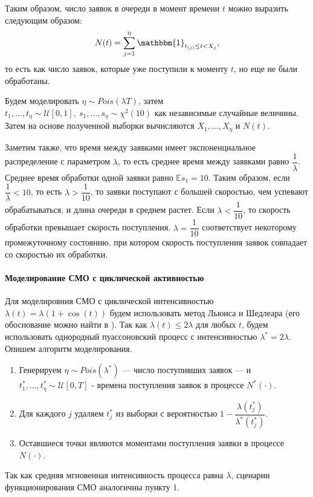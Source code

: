 \documentclass[16pt]{article}
\newcommand{\I}{\mathbbm{1}}
\begin{document}
Таким образом, число заявок в очереди в момент времени $t$ можно выразить следующим образом:
$$N(t) = \sum_{j=1}^{\eta}\I_{t_{(j)} \leq t < X_j},$$
то есть как число заявок, которые уже поступили к моменту $t$, но еще не были обработаны.

Будем моделировать $\eta \sim Pois(\lambda T)$, затем $t_1, \ldots, t_\eta \sim \mathcal{U}[0, 1],\ s_1, \ldots, s_\eta \sim \chi^2(10)$ как независимые случайные величины. Затем на основе полученной выборки вычисляются $X_1, \ldots, X_\eta$ и $N(t)$.

Заметим также, что время между заявками имеет экспоненциальное распределение с параметром $\lambda$, то есть среднее время между заявками равно $\dfrac{1}{\lambda}$. Среднее время обработки одной заявки равно $\mathbb{E}s_1 = 10$. Таким образом, если $\dfrac{1}{\lambda} < 10$, то есть $\lambda > \dfrac{1}{10}$, то заявки поступают с большей скоростью, чем успевают обрабатываться, и длина очереди в среднем растет.
Если $\lambda < \dfrac{1}{10}$, то скорость обработки превышает скорость поступления. $\lambda = \dfrac{1}{10}$ соответствует некоторому промежуточному состоянию,
при котором скорость поступления заявок совпадает со скоростью их обработки.

\paragraph{Моделирование СМО с циклической активностью}
Для моделировния СМО с циклической интенсивностью $\lambda(t) = \lambda(1 + \cos(t))$ будем использовать метод Льюиса и Шедлеара (его обоснование можно найти в \cite{Lewis}). Так как $\lambda(t) \leq 2\lambda$ для любых $t$, будем использовать однородный пуассоновский процесс с интенсивностью $\lambda^* = 2 \lambda$. Опишем алгоритм моделирования.

\begin{enumerate}
	\item Генерируем $\eta \sim Pois(\lambda^*)$ --- число поступивших заявок --- и $t_1^*, \ldots, t_\eta^* \sim \mathcal{U}[0, T]$ - времена поступления заявок в процессе $N^*(\cdot)$.
	\item Для каждого $j$ удаляем $t_j^*$ из выборки с вероятностью $1 - \dfrac{\lambda(t_j^*)}{\lambda^*(t_j^*)}$.
	\item Оставшиеся точки являются моментами поступления заявки в процессе $N(\cdot)$.
\end{enumerate}

Так как средняя мгновенная интенсивность процесса равна $\lambda$, сценарии функционирования СМО аналогичны пункту 1.
\end{document}
